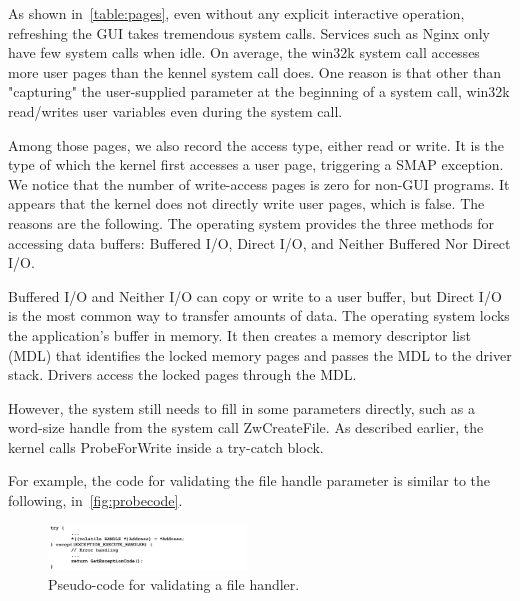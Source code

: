 As shown in~\autoref{table:pages}, even without any explicit interactive operation, refreshing the GUI takes tremendous system calls. Services such as Nginx only have few system calls when idle. On average,  the win32k system call accesses more user pages than the kennel system call does. One reason is that other than "capturing" the user-supplied parameter at the beginning of a system call, win32k read/writes user variables even during the system call. 



Among those pages, we also record the access type, either read or write. It is the type of which the kernel first accesses a user page, triggering a SMAP exception. We notice that the number of write-access pages is zero for non-GUI programs. It appears that the kernel does not directly write user pages, which is false. The reasons are the following.  The operating system provides the three methods for accessing data buffers: Buffered I/O, Direct I/O, and Neither Buffered Nor Direct I/O.

Buffered I/O and Neither I/O can copy or write to a user buffer, but Direct I/O is the most common way to transfer amounts of data. The operating system locks the application's buffer in memory. It then
creates a memory descriptor list (MDL) that identifies the locked memory pages and passes the MDL to the driver stack. Drivers access the locked pages through the MDL.

However, the system still needs to fill in some parameters directly, such as a word-size handle from the system call ZwCreateFile. As described earlier, the kernel calls ProbeForWrite inside a try-catch block.

For example, the code for validating the file handle parameter is similar to the following, in~\autoref{fig:probecode}.


%
%


\begin{figure}[th]
  \includegraphics[width=0.47\textwidth]{figures/probecode}
  \centering
  \caption{Pseudo-code for validating a file handler.}
  \label{fig:probecode}
\end{figure}

